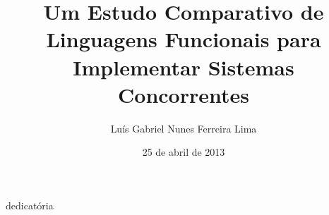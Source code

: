 \documentclass[bsc,oneside]{ufpethesis/ufpethesis}
\title{Um Estudo Comparativo de Linguagens Funcionais para Implementar Sistemas Concorrentes}
\author{Luís Gabriel Nunes Ferreira Lima}
\date{25 de abril de 2013}
\institute{Centro de Informática}
\begin{document}
\frontmatter

\frontpage

\presentationpage

\begin{dedicatory}
dedicatória
\end{dedicatory}

\acknowledgements


\resumo


\abstract


\tableofcontents

\listoffigures

\mainmatter








\backmatter

\nocite{*}


\end{document}
